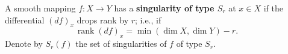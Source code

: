 A smooth mapping $f: X \to Y$ has a \textbf{singularity of type $S_r$} at $x \in X$ if the differential $(df)_x$ drops rank by $r$; i.e., if
$$
\operatorname{rank}(df)_x = \min(\dim X, \dim Y) - r.
$$
Denote by $S_r(f)$ the set of singularities of $f$ of type $S_r$.
